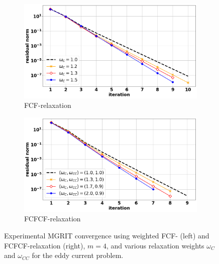 \documentclass[VANCOUVER,STIX1COL]{WileyNJD-v2}
\begin{document}
\begin{figure}[h!]
    \centering
    \begin{subfigure}[b]{0.46\textwidth}
    \includegraphics[width=\textwidth]{images/cable_fcf_relax.png}
    \caption{\normalsize FCF-relaxation}
    \label{fig:cable_conv_fcf}
    \end{subfigure}
     \begin{subfigure}[b]{0.46\textwidth}\qquad
    \includegraphics[width=\textwidth]{images/cable_fcfcf_relax.png}
    \caption{\normalsize FCFCF-relaxation}
    \label{fig:cable_conv_fcfcf}
    \end{subfigure}
    \caption{Experimental MGRIT convergence using weighted FCF- (left) and FCFCF-relaxation (right), $m=4$, and various 
    relaxation weights $\omega_C$ and $\omega_{CC}$ for the eddy current problem.\label{fig:cable_conv}}
\end{figure}


\end{document}
